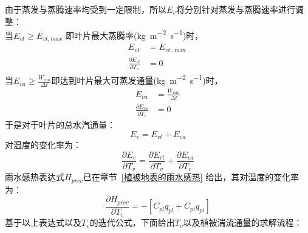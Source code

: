 由于蒸发与蒸腾速率均受到一定限制，所以$E_{v}$将分别针对蒸发与蒸腾速率进行调整：\\
当$ E_{vt} \geqslant E_{vt,max}$ 即叶片最大蒸腾率(\unit{kg.m^{-2}.s^{-1}})时，
\begin{equation}
\begin{aligned}
E_{vt} &=  E_{vt, \max } \\[1ex] 
\frac{\partial E_{vt}}{\partial T_{v}} &= 0
\end{aligned}
\end{equation}
当$E_{va} \geqslant \frac{W_{can}}{\Delta t}$即达到叶片最大可蒸发通量(\unit{kg.m^{-2}.s^{-1}})时，
\begin{equation}
  \begin{aligned}
   E_{va} &= \frac{W_{can}}{\Delta t} \\[1ex] 
   \frac{\partial E_{va}}{\partial T_{v}} &= 0
  \end{aligned}
\end{equation}
于是对于叶片的总水汽通量：
\begin{equation}
   E_{v} = E_{vt}+E_{va} 
\end{equation}
对温度的变化率为：
\begin{equation}
   \frac{\partial E_{v}}{\partial T_{v}} = \frac{\partial E_{vt}}{\partial T_{v}}+\frac{\partial E_{va}}{\partial T_{v}}
\end{equation}
雨水感热表达式$H_{prcv}$已在章节~\ref{植被地表的雨水感热} 给出，其对温度的变化率为：
\begin{equation}
\frac{\partial H_{prcv}}{\partial T_{v}}=-\left[C_{p l} q_{p l}+C_{p i} q_{p i}\right]
\end{equation}
基于以上表达式以及$T_v$的迭代公式，下面给出$T_v$以及植被湍流通量的求解流程：
